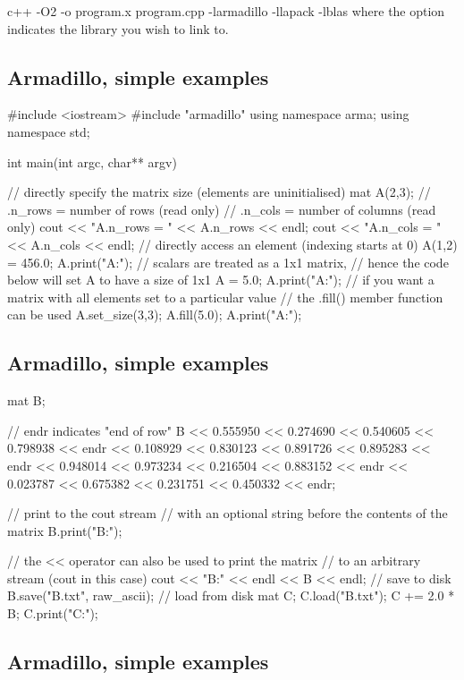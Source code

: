 \documentclass[%
twoside,                 %
final,                   %
10pt]{article}
\begin{document}
\bcppcod
c++ -O2 -o program.x program.cpp  -larmadillo -llapack -lblas
\ecppcod
where the  option indicates the library you wish to link to.

\subsection{Armadillo, simple examples}

\bcppcod
#include <iostream>
#include "armadillo"
using namespace arma;
using namespace std;

int main(int argc, char** argv)
  {
  // directly specify the matrix size (elements are uninitialised)
  mat A(2,3);
  // .n_rows = number of rows    (read only)
  // .n_cols = number of columns (read only)
  cout << "A.n_rows = " << A.n_rows << endl;
  cout << "A.n_cols = " << A.n_cols << endl;
  // directly access an element (indexing starts at 0)
  A(1,2) = 456.0;
  A.print("A:");
  // scalars are treated as a 1x1 matrix,
  // hence the code below will set A to have a size of 1x1
  A = 5.0;
  A.print("A:");
  // if you want a matrix with all elements set to a particular value
  // the .fill() member function can be used
  A.set_size(3,3);
  A.fill(5.0);  A.print("A:");
\ecppcod

\subsection{Armadillo, simple examples}

\bcppcod
  mat B;

  // endr indicates "end of row"
  B << 0.555950 << 0.274690 << 0.540605 << 0.798938 << endr
    << 0.108929 << 0.830123 << 0.891726 << 0.895283 << endr
    << 0.948014 << 0.973234 << 0.216504 << 0.883152 << endr
    << 0.023787 << 0.675382 << 0.231751 << 0.450332 << endr;

  // print to the cout stream
  // with an optional string before the contents of the matrix
  B.print("B:");

  // the << operator can also be used to print the matrix
  // to an arbitrary stream (cout in this case)
  cout << "B:" << endl << B << endl;
  // save to disk
  B.save("B.txt", raw_ascii);
  // load from disk
  mat C;
  C.load("B.txt");
  C += 2.0 * B;
  C.print("C:");
\ecppcod

\subsection{Armadillo, simple examples}

}
\end{document}

